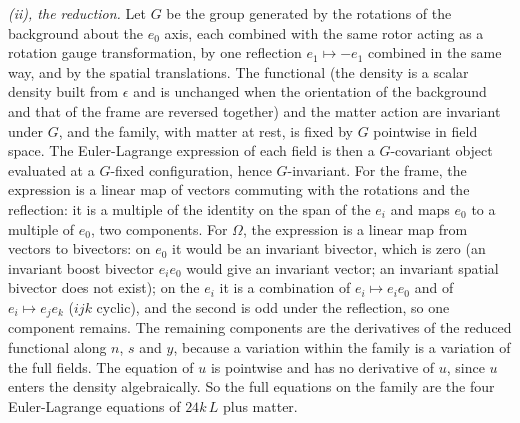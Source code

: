 \emph{(ii), the reduction.} Let $G$ be the group generated by the rotations of the background about the $e_{0}$ axis, each combined with the same rotor acting as a rotation gauge transformation, by one reflection $e_{1} \mapsto -e_{1}$ combined in the same way, and by the spatial translations. The functional (the density is a scalar density built from $\epsilon$ and is unchanged when the orientation of the background and that of the frame are reversed together) and the matter action are invariant under $G$, and the family, with matter at rest, is fixed by $G$ pointwise in field space. The Euler-Lagrange expression of each field is then a $G$-covariant object evaluated at a $G$-fixed configuration, hence $G$-invariant. For the frame, the expression is a linear map of vectors commuting with the rotations and the reflection: it is a multiple of the identity on the span of the $e_{i}$ and maps $e_{0}$ to a multiple of $e_{0}$, two components. For $\Omega$, the expression is a linear map from vectors to bivectors: on $e_{0}$ it would be an invariant bivector, which is zero (an invariant boost bivector $e_{i}e_{0}$ would give an invariant vector; an invariant spatial bivector does not exist); on the $e_{i}$ it is a combination of $e_{i} \mapsto e_{i}e_{0}$ and of $e_{i} \mapsto e_{j}e_{k}$ ($ijk$ cyclic), and the second is odd under the reflection, so one component remains. The remaining components are the derivatives of the reduced functional along $n$, $s$ and $y$, because a variation within the family is a variation of the full fields. The equation of $u$ is pointwise and has no derivative of $u$, since $u$ enters the density algebraically. So the full equations on the family are the four Euler-Lagrange equations of $24k\,L$ plus matter.

